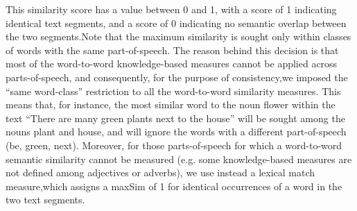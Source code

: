    This similarity score has a value between 0 and 1, with a score of 1 indicating identical text segments, and a score of 0 indicating no semantic overlap between the two segments.Note that the maximum similarity is sought only within classes of words with the same part-of-speech. The reason behind this decision is that most of the word-to-word knowledge-based measures cannot be applied across parts-of-speech, and consequently, for the purpose of consistency,we imposed the “same word-class” restriction to all the word-to-word similarity measures. This means that, for instance, the most similar word to the noun flower within the text “There are many green plants next to the house” will be sought among the nouns plant and house, and will ignore the words with a different part-of-speech (be, green, next). Moreover, for those parts-of-speech for which a word-to-word semantic similarity cannot be measured (e.g. some knowledge-based measures are not defined among adjectives or adverbs), we use instead a lexical match measure,which assigns a maxSim of 1 for identical occurrences of a word in the two text segments.
